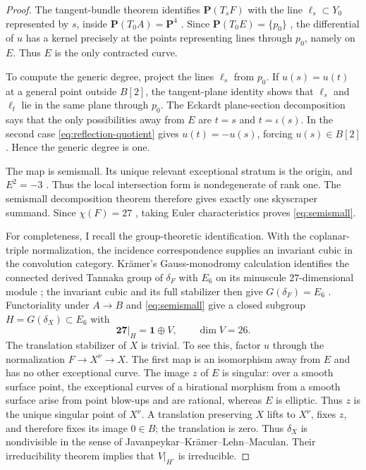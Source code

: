 \documentclass[11pt,reqno]{amsart}
\numberwithin{equation}{section}
\theoremstyle{definition}
\theoremstyle{remark}
\newcommand{\PP}{\mathbf P}
\begin{document}
\begin{proof}
The tangent-bundle theorem identifies $\PP(T_sF)$ with the line $\ell_s\subset Y_0$ represented by $s$, inside $\PP(T_0A)=\PP^4$ \cite{ClemensGriffiths1972}.  Since $\PP(T_0E)=\{p_0\}$ \cite[Proposition~4]{Roulleau2009}, the differential of $u$ has a kernel precisely at the points representing lines through $p_0$, namely on $E$.  Thus $E$ is the only contracted curve.

To compute the generic degree, project the lines $\ell_s$ from $p_0$.  If $u(s)=u(t)$ at a general point outside $B[2]$, the tangent-plane identity shows that $\ell_s$ and $\ell_t$ lie in the same plane through $p_0$.  The Eckardt plane-section decomposition says that the only possibilities away from $E$ are $t=s$ and $t=\iota(s)$.  In the second case \eqref{eq:reflection-quotient} gives $u(t)=-u(s)$, forcing $u(s)\in B[2]$.  Hence the generic degree is one.

The map is semismall.  Its unique relevant exceptional stratum is the origin, and $E^2=-3$ \cite[Proposition~10]{Roulleau2009}.  Thus the local intersection form is nondegenerate of rank one.  The semismall decomposition theorem \cite{deCataldoMigliorini2002} therefore gives exactly one skyscraper summand.  Since $\chi(F)=27$ \cite{ClemensGriffiths1972}, taking Euler characteristics proves \eqref{eq:semismall}.

For completeness, I recall the group-theoretic identification.  With the coplanar-triple normalization, the incidence correspondence supplies an invariant cubic in the convolution category.  Kr\"amer's Gauss-monodromy calculation identifies the connected derived Tannaka group of $\delta_F$ with $E_6$ on its minuscule $27$-dimensional module \cite{Kramer2016}; the invariant cubic and its full stabilizer then give $G(\delta_F)=E_6$ \cite{Kramer2022}.  Functoriality under $A\to B$ and \eqref{eq:semismall} give a closed subgroup $H=G(\delta_X)\subset E_6$ with
\[
\mathbf{27}|_H=\mathbf1\oplus V,
\qquad \dim V=26.
\]
The translation stabilizer of $X$ is trivial.  To see this, factor $u$ through the normalization $F\to X^\nu\to X$.  The first map is an isomorphism away from $E$ and has no other exceptional curve.  The image $z$ of $E$ is singular: over a smooth surface point, the exceptional curves of a birational morphism from a smooth surface arise from point blow-ups and are rational, whereas $E$ is elliptic.  Thus $z$ is the unique singular point of $X^\nu$.  A translation preserving $X$ lifts to $X^\nu$, fixes $z$, and therefore fixes its image $0\in B$; the translation is zero.  Thus $\delta_X$ is nondivisible in the sense of Javanpeykar--Kr\"amer--Lehn--Maculan.  Their irreducibility theorem \cite[Proposition~3.3(2)]{JKLM2025} implies that $V|_{H^\circ}$ is irreducible.


\end{proof}
\end{document}
